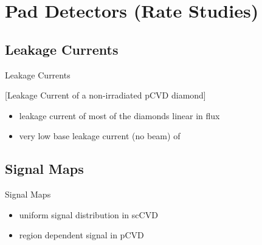 \section{Pad Detectors (Rate Studies)}
\subsection{Leakage Currents}
\begin{frame}{Leakage Currents}
	
	[Leakage Current of a non-irradiated pCVD diamond]
		
	\begin{itemize}\itemfill
		\item leakage current of most of the diamonds linear in flux
		\item very low base leakage current (no beam) of 
	\end{itemize}
	
\end{frame}
\subsection{Signal Maps}
\begin{frame}{Signal Maps}

	
	\begin{itemize} \itemfill
		\item uniform signal distribution in scCVD
		\item region dependent signal in pCVD
	\end{itemize}
	
\end{frame}
